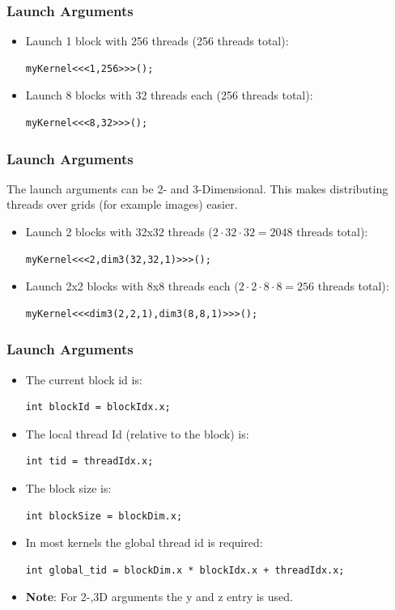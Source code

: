 \documentclass[aspectratio=169]{beamer}
\begin{document}
\begin{frame}[fragile]
	\frametitle{Launch Arguments}
	\begin{itemize}
		\item Launch 1 block with 256 threads (256 threads total):
\begin{lstlisting}
myKernel<<<1,256>>>();
\end{lstlisting}
		\item Launch 8 blocks with 32 threads each (256 threads total):
\begin{lstlisting}
myKernel<<<8,32>>>();
\end{lstlisting}
	\end{itemize}
\end{frame}

\begin{frame}[fragile]
	\frametitle{Launch Arguments}
	The launch arguments can be 2- and 3-Dimensional. This makes distributing threads over grids (for example images) easier.
	\begin{itemize}
		\item Launch 2 blocks with 32x32 threads ($2 \cdot 32 \cdot 32 = 2048$ threads total):
\begin{lstlisting}
myKernel<<<2,dim3(32,32,1)>>>();
\end{lstlisting}
		\item Launch 2x2 blocks with 8x8 threads each ($2\cdot 2 \cdot 8 \cdot 8 = 256$ threads total):
\begin{lstlisting}
myKernel<<<dim3(2,2,1),dim3(8,8,1)>>>();
\end{lstlisting}
	\end{itemize}
\end{frame}



\begin{frame}[fragile]
\frametitle{Launch Arguments}

\begin{itemize}
	\item The current block id is:
\begin{lstlisting}
int blockId = blockIdx.x;
\end{lstlisting}
	\item The local thread Id (relative to the block) is:
\begin{lstlisting}
int tid = threadIdx.x;
\end{lstlisting}
	\item The block size is:
\begin{lstlisting}
int blockSize = blockDim.x;
\end{lstlisting}	
	\item In most kernels the global thread id is required:
\begin{lstlisting}
int global_tid = blockDim.x * blockIdx.x + threadIdx.x;
\end{lstlisting}
	\item \textbf{Note}: For 2-,3D arguments the y and z entry is used.
\end{itemize}
\end{frame}
\end{document}
